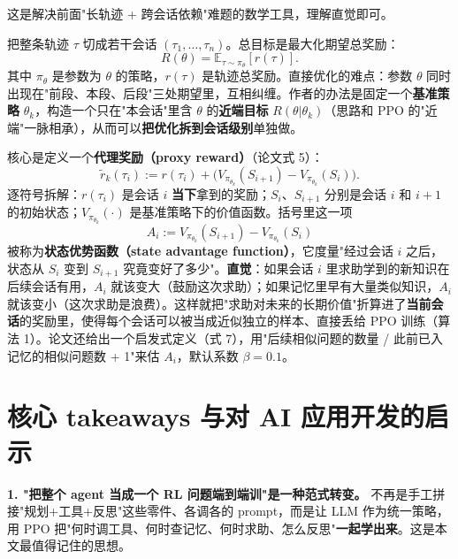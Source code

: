 \documentclass[11pt,UTF8,fontset=fandol]{ctexart}
\begin{document}
这是解决前面"长轨迹 + 跨会话依赖"难题的数学工具，理解直觉即可。

把整条轨迹 $\tau$ 切成若干会话 $(\tau_1,\dots,\tau_n)$。总目标是最大化期望总奖励：
\begin{equation*}
R(\theta) = \mathbb{E}_{\tau \sim \pi_\theta}[r(\tau)].
\end{equation*}
其中 $\pi_\theta$ 是参数为 $\theta$ 的策略，$r(\tau)$ 是轨迹总奖励。直接优化的难点：参数 $\theta$ 同时出现在"前段、本段、后段"三处期望里，互相纠缠。作者的办法是固定一个\textbf{基准策略} $\theta_k$，构造一个只在"本会话"里含 $\theta$ 的\textbf{近端目标} $R(\theta|\theta_k)$（思路和 PPO 的"近端"一脉相承），从而可以\textbf{把优化拆到会话级别}单独做。

核心是定义一个\textbf{代理奖励（proxy reward）}（论文式 5）：
\begin{equation*}
\tilde{r}_k(\tau_i) := r(\tau_i) + \big(V_{\pi_{\theta_k}}(S_{i+1}) - V_{\pi_{\theta_k}}(S_i)\big).
\end{equation*}
逐符号拆解：$r(\tau_i)$ 是会话 $i$ \textbf{当下}拿到的奖励；$S_i$、$S_{i+1}$ 分别是会话 $i$ 和 $i{+}1$ 的初始状态；$V_{\pi_{\theta_k}}(\cdot)$ 是基准策略下的价值函数。括号里这一项
\begin{equation*}
A_i := V_{\pi_{\theta_k}}(S_{i+1}) - V_{\pi_{\theta_k}}(S_i)
\end{equation*}
被称为\textbf{状态优势函数（state advantage function）}，它度量"经过会话 $i$ 之后，状态从 $S_i$ 变到 $S_{i+1}$ 究竟变好了多少"。\textbf{直觉}：如果会话 $i$ 里求助学到的新知识在后续会话有用，$A_i$ 就该变大（鼓励这次求助）；如果记忆里早有大量类似知识，$A_i$ 就该变小（这次求助是浪费）。这样就把"求助对未来的长期价值"折算进了\textbf{当前会话}的奖励里，使得每个会话可以被当成近似独立的样本、直接丢给 PPO 训练（算法 1）。论文还给出一个启发式定义（式 7），用"后续相似问题的数量 / 此前已入记忆的相似问题数 + 1"来估 $A_i$，默认系数 $\beta=0.1$。

\section{核心 takeaways 与对 AI 应用开发的启示}

\begin{takeaway}
\textbf{1. "把整个 agent 当成一个 RL 问题端到端训"是一种范式转变。} 不再是手工拼接"规划+工具+反思"这些零件、各调各的 prompt，而是让 LLM 作为统一策略，用 PPO 把"何时调工具、何时查记忆、何时求助、怎么反思"\textbf{一起学出来}。这是本文最值得记住的思想。
\end{takeaway}
\end{document}
